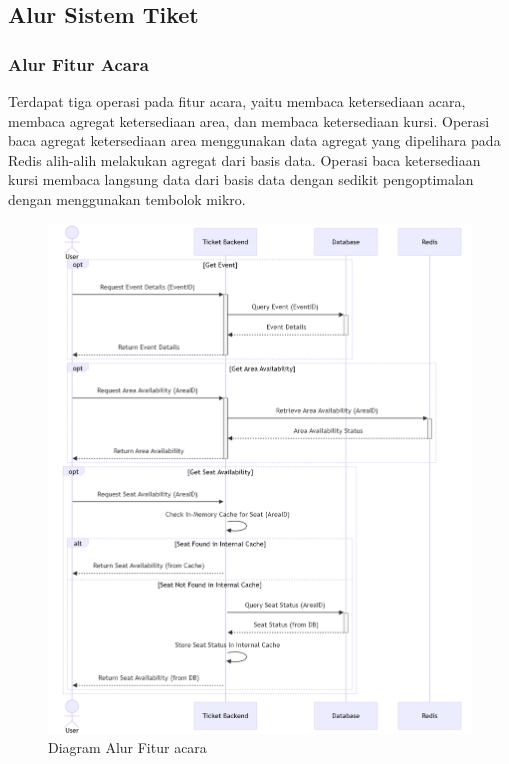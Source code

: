 \subsection{Alur Sistem Tiket}

\subsubsection{Alur Fitur Acara}

Terdapat tiga operasi pada fitur acara, yaitu membaca ketersediaan acara, membaca agregat ketersediaan area, dan membaca ketersediaan kursi. Operasi baca agregat ketersediaan area menggunakan data agregat yang dipelihara pada Redis alih-alih melakukan agregat dari basis data. Operasi baca ketersediaan kursi membaca langsung data dari basis data dengan sedikit pengoptimalan dengan menggunakan tembolok mikro.

\pagebreak

\begin{figure}[h]
    \centering
    \includegraphics[width=1\textwidth]{resources/chapter-3/event-flow.png}
    \caption{Diagram Alur Fitur acara}
    \label{fig:flow-event}
\end{figure}


